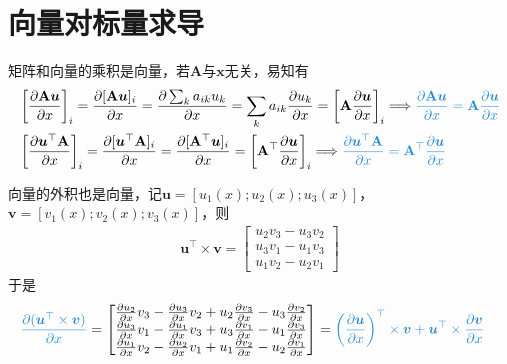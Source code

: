 \documentclass{ctexart}
\newcommand{\blue}[1]{\textcolor{Solarized-blue}{#1}}
\theoremstyle{definition}
\def \uv {\bm{u}}
\def \vv {\bm{v}}
\def \xv {\bm{x}}
\def \Av {\mathbf{A}}
\begin{document}
\section{向量对标量求导}

矩阵和向量的乘积是向量，若$\Av$与$\xv$无关，易知有
\begin{align*}
     & \left[ \frac{\partial \Av \uv}{\partial x} \right]_{i} = \frac{\partial [\Av \uv]_i}{\partial x} = \frac{\partial \sum_k a_{ik} u_k}{\partial x} = \sum_k a_{ik} \frac{\partial u_k}{\partial x} = \left[ \Av \frac{\partial \uv}{\partial x} \right]_i \Longrightarrow \blue{\frac{\partial \Av \uv}{\partial x} = \Av \frac{\partial \uv}{\partial x}} \\
     & \left[ \frac{\partial \uv^\top \Av}{\partial x} \right]_i = \frac{\partial [\uv^\top \Av]_i}{\partial x} = \frac{\partial [\Av^\top \uv]_i}{\partial x} = \left[ \Av^\top \frac{\partial \uv}{\partial x} \right]_i \Longrightarrow \blue{\frac{\partial \uv^\top \Av}{\partial x} = \Av^\top \frac{\partial \uv}{\partial x}}
\end{align*}

向量的外积也是向量，记$\uv = [u_1(x); u_2(x); u_3(x)]$，$\vv = [v_1(x); v_2(x); v_3(x)]$，则
\begin{align*}
    \uv^\top \times \vv = \begin{bmatrix}
        u_2 v_3 - u_3 v_2 \\ u_3 v_1 - u_1 v_3 \\ u_1 v_2 - u_2 v_1
    \end{bmatrix}
\end{align*}
于是
\begin{align*}
    \blue{\frac{\partial (\uv^\top \times \vv)}{\partial x}} & = \begin{bmatrix}
        \frac{\partial u_2}{\partial x} v_3 - \frac{\partial u_3}{\partial x} v_2 + u_2 \frac{\partial v_3}{\partial x} - u_3 \frac{\partial v_2}{\partial x} \\
        \frac{\partial u_3}{\partial x} v_1 - \frac{\partial u_1}{\partial x} v_3 + u_3 \frac{\partial v_1}{\partial x} - u_1 \frac{\partial v_3}{\partial x} \\
        \frac{\partial u_1}{\partial x} v_2 - \frac{\partial u_2}{\partial x} v_1 + u_1 \frac{\partial v_2}{\partial x} - u_2 \frac{\partial v_1}{\partial x} \\
    \end{bmatrix} = \blue{\left( \frac{\partial \uv}{\partial x} \right)^\top \times \vv + \uv^\top \times \frac{\partial \vv}{\partial x}}
\end{align*}
\end{document}
